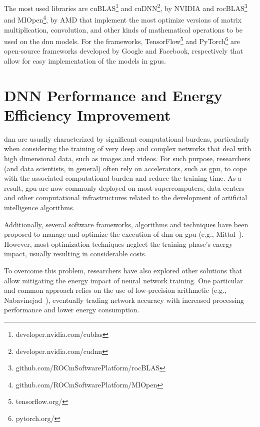 The most used libraries are cuBLAS\footnote{developer.nvidia.com/cublas} and cuDNN\footnote{developer.nvidia.com/cudnn}, by NVIDIA and rocBLAS\footnote{github.com/ROCmSoftwarePlatform/rocBLAS} and MIOpen\footnote{github.com/ROCmSoftwarePlatform/MIOpen}, by AMD that implement the most optimize versions of matrix multiplication, convolution, and other kinds of mathematical operations to be used on the \acrshort{dnn} models. For the frameworks, TensorFlow\footnote{tensorflow.org/} and PyTorch\footnote{pytorch.org/} are open-source frameworks developed by Google and Facebook, respectively that allow for easy implementation of the models in \acrshort{gpu}s.

\section{DNN Performance and Energy Efficiency Improvement}
\label{section:DNN_conventional}

\acrshort{dnn} are usually characterized by significant computational burdens, particularly when considering the training of very deep and complex networks that deal with high dimensional data, such as images and videos. For such purpose, researchers (and data scientists, in general) often rely on accelerators, such as \acrshort{gpu}, to cope with the associated computational burden and reduce the training time. As a result, \acrshort{gpu} are now commonly deployed on most supercomputers, data centers and other computational infrastructures related to the development of artificial intelligence algorithms.

Additionally, several software frameworks, algorithms and techniques have been proposed to manage and optimize the execution of  \acrshort{dnn} on \acrshort{gpu} (e.g., Mittal~\cite{mittal_survey_2019}). However, most optimization techniques neglect the training phase's energy impact, usually resulting in considerable costs. 

To overcome this problem, researchers have also explored other solutions that allow mitigating the energy impact of neural network training. One particular and common approach relies on the use of low-precision arithmetic (e.g., Nabavinejad~\cite{nabavinejad_coordinated_2019}), eventually trading network accuracy with increased processing performance and lower energy consumption.

